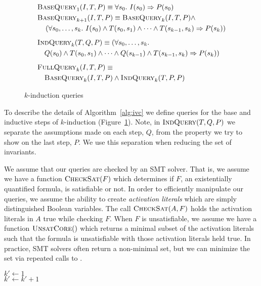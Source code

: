 \begin{figure}
\begin{align*}
  &\bq_1(I, T, P) \equiv \forall s_0.~ I(s_0) \Rightarrow P(s_0) \\
  &\bq_{k+1}(I, T, P) \equiv \bq_k(I, T, P) \land~ \\
%
  &\hspace{10pt}\left(\forall s_0, \ldots, s_k.~ I(s_0) \land T(s_0,
  s_1) \land \cdots \land T(s_{k-1}, s_k) \Rightarrow P(s_k)\right)
  \\[5pt]
  &\iq_k(T, Q, P) \equiv (\forall s_0, \ldots, s_k.~\\
%
  &\hspace{10pt} Q(s_0) \land T(s_0,
  s_1) \land \cdots \land Q(s_{k-1}) \land T(s_{k-1}, s_k) \Rightarrow
  P(s_k)) \\[5pt]
  &\fq_k(I, T, P) \equiv \\
%
  &\hspace{10pt}\bq_k(I, T, P) \land \iq_k(T, P, P)
\end{align*}
\caption{$k$-induction queries}
\label{fig:queries}
\end{figure}

To describe the details of Algorithm~\ref{alg:ivc} we define queries
for the base and inductive steps of $k$-induction
(Figure~\ref{fig:queries}). Note, in $\textsc{IndQuery}(T, Q, P)$ we separate the
assumptions made on each step, $Q$, from the property we try to show
on the last step, $P$. We use this separation when reducing the set of
invariants.

We assume that our queries are checked by an SMT solver. That is, we
assume we have a function $\textsc{CheckSat}(F)$ which determines if $F$, an
existentially quantified formula, is satisfiable or not. In order to
efficiently manipulate our queries, we assume the ability to create
{\em activation literals} which are simply distinguished Boolean
variables. The call $\textsc{CheckSat}(A, F)$ holds the activation literals in
$A$ true while checking $F$. When $F$ is unsatisfiable, we assume we
have a function $\textsc{UnsatCore}()$ which returns a minimal subset of the
activation literals such that the formula is unsatisfiable with those
activation literals held true. In practice, SMT solvers often return a
non-minimal set, but we can minimize the set via repeated calls to
\checksat.

\begin{algorithm}[t]
  $k' \leftarrow 1$ \\
   {
    $k' \leftarrow k' + 1$ \\
    }
   \\
\caption{$\mink(T, P)$}
\label{alg:minimize-k}
\end{algorithm}

